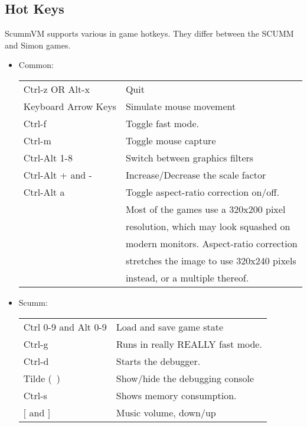 

\subsection{Hot Keys}
ScummVM supports various in game hotkeys. They differ between the SCUMM and
Simon games.
\begin{itemize}
\item Common:\\
  \begin{tabular}{ll}
    Ctrl-z OR Alt-x        & Quit\\
    Keyboard Arrow Keys    & Simulate mouse movement\\
    Ctrl-f                 & Toggle fast mode.\\
    Ctrl-m                 & Toggle mouse capture\\
    Ctrl-Alt 1-8           & Switch between graphics filters\\
    Ctrl-Alt + and -       & Increase/Decrease the scale factor\\
    Ctrl-Alt a             & Toggle aspect-ratio correction on/off.\\
                           & Most of the games use a 320x200 pixel\\
                           & resolution, which may look squashed on\\
                           & modern monitors. Aspect-ratio correction\\
                           & stretches the image to use 320x240 pixels\\
                           & instead, or a multiple thereof.\\
  \end{tabular}
\item Scumm:\\
  \begin{tabular}{ll}
    Ctrl 0-9 and Alt 0-9   & Load and save game state\\
    Ctrl-g                 & Runs in really REALLY fast mode.\\
    Ctrl-d                 & Starts the debugger.\\
    Tilde (~)              & Show/hide the debugging console\\
    Ctrl-s                 & Shows memory consumption.\\
    $[$ and $]$                & Music volume, down/up\\

\end{tabular}
\end{itemize}

